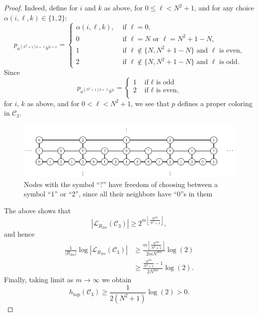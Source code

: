 \documentclass[letterpaper,11pt,reqno]{amsart}
\theoremstyle{plain}
\theoremstyle{definition}
\def\htop{h_{\mathrm{top}}}
\begin{document}
\begin{proof}
	Indeed, define for $i$ and $k$ as above, for $0\le \ell <N^2+1$, and for any choice $\alpha(i,\ell,k)\in\{1,2\}$:
	$$
	p_{a^{(N^2+1)k+\ell}b^{2i+1}}=\begin{cases}
	\alpha(i,\ell,k), &\text{ if }\ell=0,\\
	0 \ &\text{ if } \ell=N \text{ or }\ell=N^2+1-N,\\
	1\ &\text{ if } \ell\notin\{N,N^2+1-N\} \text{ and }\ell \text{ is even,}\\
	2\ &\text{ if } \ell\notin\{N,N^2+1-N\} \text{ and }\ell \text{ is odd}.
	\end{cases}
	$$
	Since $$p_{a^{(N^2+1)k+\ell}b^{2i}}=\begin{cases}
	1 &\text{ if }\ell \text{ is odd}\\
	2 &\text{ if }\ell \text{ is even,}\\
	\end{cases}$$
	for $i$, $k$ as above, and for $0<\ell<N^2+1$,
	we see that $p$ defines a proper coloring in $\mathcal{C}_3$.
	
	
	\begin{figure}
		\centering
		\includegraphics[]{freespace_entropy.pdf}
		\caption{Nodes with the symbol ``?'' have freedom of choosing between a symbol ``1'' or ``2'', since all their neighbors have ``0''s in them}
	\end{figure}
	
	The above shows that
	$$
	|\mathcal{L}_{R_{2m}}(\mathcal{C}_3)|\ge 2^{m\left\lfloor \frac{N^{2m}}{N^2+1}\right\rfloor },
	$$
	and hence
	\begin{align*}
	\frac{1}{|R_{2m}|}\log |\mathcal{L}_{R_{2m}}(\mathcal{C}_3)|&\ge\frac{m\left\lfloor \frac{N^{2m}}{N^2+1}\right\rfloor}{2mN^{2m}}\log(2) \\
	&\ge \frac{\frac{N^{2m}}{N^2+1}-1}{2N^{2m}}\log(2).
	\end{align*}
	Finally, taking limit as $m\to\infty$ we obtain
	$$
	\htop(\mathcal{C}_3)\ge \frac{1}{2(N^2+1)}\log(2)>0.
	$$
\end{proof}	
\end{document}
